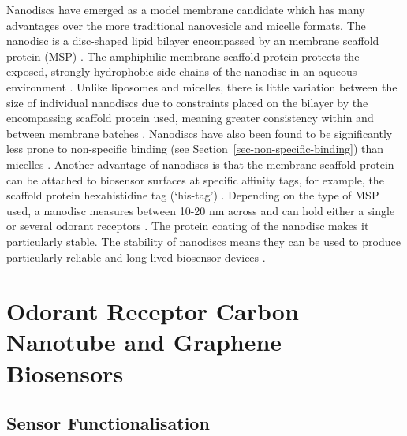 \documentclass[
  a4paper,
]{scrbook}
\begin{document}
Nanodiscs have emerged as a model membrane candidate which has many
advantages over the more traditional nanovesicle and micelle formats.
The nanodisc is a disc-shaped lipid bilayer encompassed by an membrane
scaffold protein (MSP) \autocite{Nath2007,Bayburt2010,Yang2018}. The
amphiphilic membrane scaffold protein protects the exposed, strongly
hydrophobic side chains of the nanodisc in an aqueous environment
\autocite{Fruh2011,Yang2018}. Unlike liposomes and micelles, there is
little variation between the size of individual nanodiscs due to
constraints placed on the bilayer by the encompassing scaffold protein
used, meaning greater consistency within and between membrane batches
\autocite{Nath2007,Fruh2011}. Nanodiscs have also been found to be
significantly less prone to non-specific binding (see
Section~\ref{sec-non-specific-binding}) than micelles
\autocite{Fruh2011}. Another advantage of nanodiscs is that the membrane
scaffold protein can be attached to biosensor surfaces at specific
affinity tags, for example, the scaffold protein hexahistidine tag
(`his-tag') \autocite{Bayburt2010,Fruh2011}. Depending on the type of
MSP used, a nanodisc measures between 10-20 nm across and can hold
either a single or several odorant receptors
\autocite{Nath2007,Bayburt2010}. The protein coating of the nanodisc
makes it particularly stable. The stability of nanodiscs means they can
be used to produce particularly reliable and long-lived biosensor
devices \autocite{Goldsmith2011,Yang2018,Moon2020,Cheema2021}.

\hypertarget{odorant-receptor-carbon-nanotube-and-graphene-biosensors}{%
\section{Odorant Receptor Carbon Nanotube and Graphene
Biosensors}\label{odorant-receptor-carbon-nanotube-and-graphene-biosensors}}

\hypertarget{sec-sensor-types}{%
\subsection{Sensor Functionalisation}\label{sec-sensor-types}}
\end{document}
